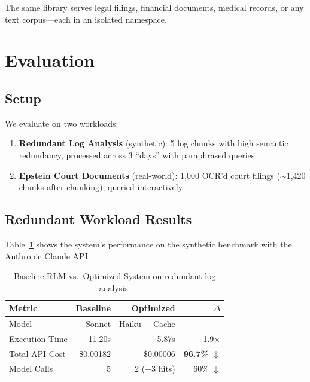 \documentclass[11pt,twocolumn]{article}
\begin{document}
The same library serves legal filings, financial documents, medical records, or any text corpus---each in an isolated namespace.

\section{Evaluation}
\label{sec:eval}

\subsection{Setup}

We evaluate on two workloads:

\begin{enumerate}
    \item \textbf{Redundant Log Analysis} (synthetic): 5 log chunks with high semantic redundancy, processed across 3 ``days'' with paraphrased queries.
    \item \textbf{Epstein Court Documents} (real-world): 1,000 OCR'd court filings ($\sim$1,420 chunks after chunking), queried interactively.
\end{enumerate}

\subsection{Redundant Workload Results}

Table~\ref{tab:benchmark} shows the system's performance on the synthetic benchmark with the Anthropic Claude API.

\begin{table}[t]
\centering
\caption{Baseline RLM vs.\ Optimized System on redundant log analysis.}
\label{tab:benchmark}
\begin{tabular}{lrrr}
\toprule
\textbf{Metric} & \textbf{Baseline} & \textbf{Optimized} & \textbf{$\Delta$} \\
\midrule
Model & Sonnet & Haiku + Cache & --- \\
Execution Time & 11.20s & 5.87s & 1.9$\times$ \\
Total API Cost & \$0.00182 & \$0.00006 & \textbf{96.7\%} $\downarrow$ \\
Model Calls & 5 & 2 (+3 hits) & 60\% $\downarrow$ \\
\bottomrule
\end{tabular}
\end{table}
\end{document}
